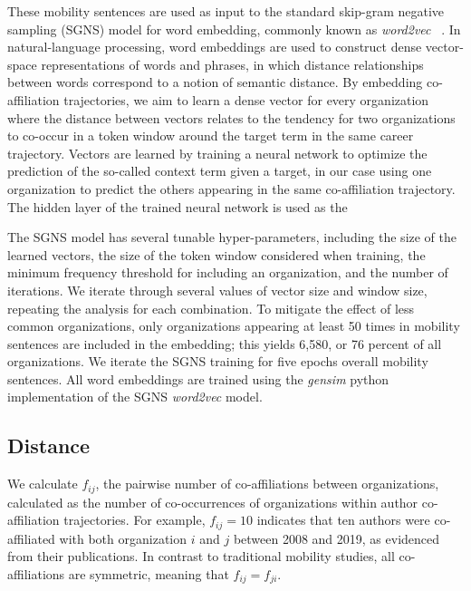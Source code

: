 \documentclass[12pt]{article} %
\begin{document}
These mobility sentences are used as input to the standard skip-gram negative sampling (SGNS) model for word embedding, commonly known as \textit{word2vec}~\cite{mikolov2013word2vec} . 
In natural-language processing, word embeddings are used to construct dense vector-space representations of words and phrases, in which distance relationships between words correspond to a notion of semantic distance. 
By embedding co-affiliation trajectories, we aim to learn a dense vector for every organization where the distance between vectors relates to the tendency for two organizations to co-occur in a token window around the target term in the same career trajectory. 
Vectors are learned by training a neural network to optimize the prediction of the so-called context term given a target, in our case using one organization to predict the others appearing in the same co-affiliation trajectory. 
The hidden layer of the trained neural network is used as the 

The SGNS model has several tunable hyper-parameters, including the size of the learned vectors, the size of the token window considered when training, the minimum frequency threshold for including an organization, and the number of iterations.
We iterate through several values of vector size and window size, repeating the analysis for each combination. 
To mitigate the effect of less common organizations, only organizations appearing at least 50 times in mobility sentences are included in the embedding;
this yields 6,580, or 76 percent of all organizations.
We iterate the SGNS training for five epochs overall mobility sentences. 
All word embeddings are trained using the \textit{gensim} python implementation of the SGNS \textit{word2vec} model. 

%
%
\subsection{Distance}
We calculate $f_{ij}$, the pairwise number of co-affiliations between organizations, calculated as the number of co-occurrences of organizations within author co-affiliation trajectories. 
For example, $f_{ij} = 10$ indicates that ten authors were co-affiliated with both organization $i$ and $j$ between 2008 and 2019, as evidenced from their publications. 
In contrast to traditional mobility studies, all co-affiliations are symmetric, meaning that $f_{ij} = f_{ji}$. 
\end{document}
